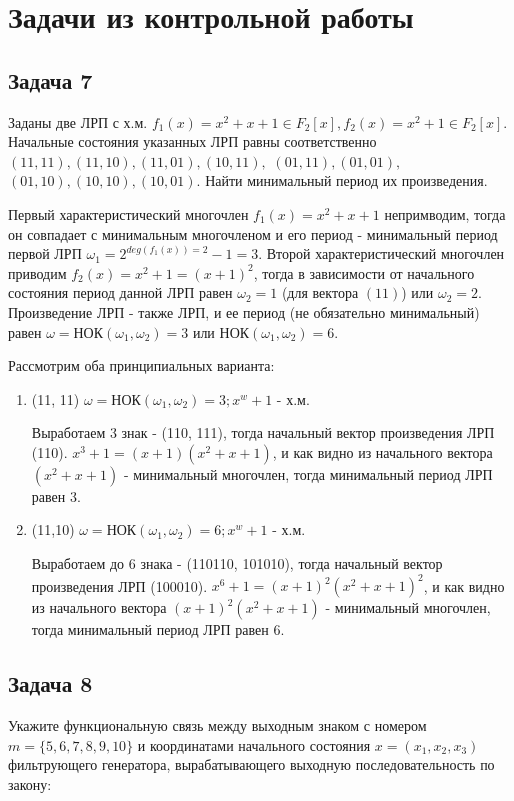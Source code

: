 \documentclass[utf8x, 14pt]{G7-32} %
\begin{document}
\section{Задачи из контрольной работы }
\subsection{Задача 7}
Заданы две ЛРП с х.м. $f_1(x)=x^2+x+1 \in F_2[x], f_2(x)=x^2+1\in F_2[x]$. Начальные состояния указанных ЛРП равны соответственно $ (11, 11), (11, 10), (11, 01), (10, 11),$ $ (01, 11), (01, 01), $ $(01, 10), (10, 10), (10, 01) $. Найти минимальный период их произведения.

Первый характеристический многочлен $f_1(x)=x^2+x+1$ непримводим, тогда он совпадает с минимальным многочленом и его период - минимальный период первой ЛРП $\omega_1 = 2^{deg(f_1(x))=2} -1 = 3$. Второй характеристический многочлен приводим $f_2(x)=x^2+1 = (x+1)^2$, тогда в зависимости от начального состояния период данной ЛРП равен $\omega_2 = 1$ (для вектора $(11)$) или $\omega_2 = 2$. Произведение ЛРП - также ЛРП, и ее период (не обязательно минимальный) равен $\omega = $НОК$(\omega_1,\omega_2) = 3$ или НОК$(\omega_1,\omega_2) = 6$.

Рассмотрим оба принципиальных варианта:
\begin{enumerate}
    \item (11, 11)
    $\omega = $НОК$(\omega_1,\omega_2) = 3; x^w+1$ - х.м.
    
    Выработаем 3 знак - (110, 111), тогда начальный вектор произведения ЛРП (110). $x^3+1 = (x+1)(x^2+x+1)$, и как видно из начального вектора $(x^2+x+1)$ - минимальный многочлен, тогда минимальный период ЛРП равен $3$.
    \item (11,10)
    $\omega = $НОК$(\omega_1,\omega_2) = 6; x^w+1$ - х.м.
    
    Выработаем до 6 знака - (110110, 101010), тогда начальный вектор произведения ЛРП (100010). $x^6+1 = (x+1)^2(x^2+x+1)^2$, и как видно из начального вектора $(x+1)^2(x^2+x+1)$ - минимальный многочлен, тогда минимальный период ЛРП равен $6$.
\end{enumerate}

\subsection{Задача 8}
Укажите функциональную связь между выходным знаком с номером $m = \{5,6,7,8,9,10\}$ и координатами начального состояния $x=(x_1,x_2,x_3)$ фильтрующего генератора, вырабатывающего выходную последовательность по закону: 
\end{document}
